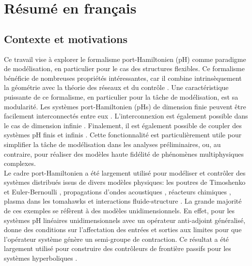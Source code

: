
\chapter*{R\'esum\'e en fran\c{c}ais}

\minitoc

\section{Contexte et motivations}

Ce travail vise à explorer le formalisme port-Hamiltonien (pH) comme paradigme de modélisation, en particulier pour le cas des structures flexibles. Ce formalisme bénéficie de nombreuses propriétés intéressantes, car il combine intrinsèquement la géométrie avec la théorie des réseaux et du contrôle \cite{vanderschaft2006book}. Une caractéristique puissante de ce formalisme, en particulier pour la tâche de modélisation, est sa modularité. Les systèmes port-Hamiltonien (pHs) de dimension finie peuvent être facilement interconnectés entre eux \cite{cervera2007interconnection}. L'interconnexion est également possible dans le cas de dimension infinie \cite{kurula2010,augner2020int}. Finalement, il est également possible de coupler des systèmes pH finis et infinis \cite{pasumarthy2006}. Cette fonctionnalité est particulièrement utile pour simplifier la tâche de modélisation dans les analyses préliminaires, ou, au contraire, pour réaliser des modèles haute fidélité de phénomènes multiphysiques complexes. \\

Le cadre port-Hamiltonien a été largement utilisé pour modéliser et contrôler des systèmes distribués issus de divers modèles physiques: les poutres de Timoshenko \cite{macchelli2004timo} et Euler-Bernoulli \cite{aoues2017modeling}, propagations d'ondes acoustiques \cite{trenchant2018}, réacteurs chimiques \cite{ramirez2013irreversible}, plasma dans les tomahawks \cite{vu2016plasma} et interactions fluide-structure \cite{cardoso2017}. La grande majorité de ces exemples se réfèrent à des modèles unidimensionnels. En effet, pour les systèmes pH linéaires unidimensionnels avec un opérateur anti-adjoint généralisé, \cite{legorrec2005} donne des conditions sur l'affectation des entrées et sorties aux limites pour que l'opérateur système génère un semi-groupe de contraction. Ce résultat a été largement utilisé pour construire des contrôleurs de frontière passifs pour les systèmes hyperboliques \cite{villegas2009exponential,macchelli2016synthesis,macchelli2020exponential}. \\

